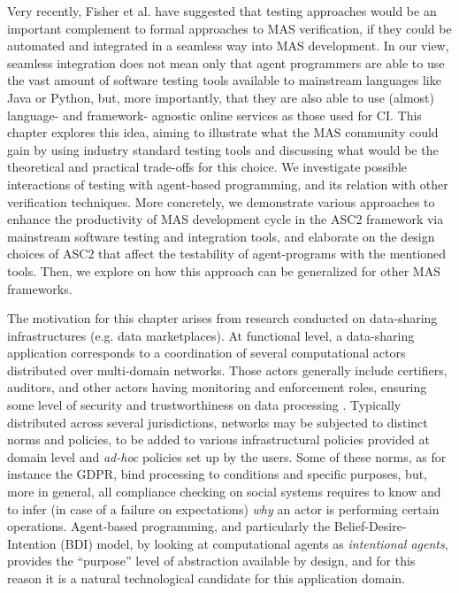 Very recently, Fisher et al. \cite{Fisher2020} have suggested that testing approaches would be an important complement to formal approaches to MAS verification, if they could be automated and integrated in a seamless way into MAS development. In our view, seamless integration  does not mean only that agent programmers are able to use the vast amount of software testing tools available to mainstream languages like Java or Python, but, more importantly, that they are also able to use (almost) language- and framework- agnostic online services as those used for CI. This chapter explores this idea, aiming to illustrate what the MAS community could gain by using industry standard testing tools and discussing what would be the theoretical and practical trade-offs for this choice. We investigate possible interactions of testing with agent-based programming, and its relation with other verification techniques. More concretely, we demonstrate various approaches to enhance the productivity of MAS development cycle in the ASC2 framework via mainstream software testing and integration tools, and elaborate on the design choices of ASC2 that affect the testability of agent-programs with the mentioned tools. Then, we explore on how this approach can be generalized for other MAS frameworks.

The motivation for this chapter arises from research conducted
on data-sharing infrastructures (e.g. data marketplaces). At functional level, a data-sharing application corresponds to a coordination of several computational actors distributed over multi-domain networks. Those actors generally include certifiers, auditors, and other actors having monitoring and enforcement roles, ensuring some level of security and trustworthiness on data processing \cite{Zhou2020}.  Typically distributed across several jurisdictions, networks may be subjected to distinct norms and policies, to be added to  various infrastructural policies provided at domain level and \textit{ad-hoc} policies set up by the users. Some of these norms, as for instance the GDPR, bind  processing to conditions and specific purposes, but, more in general, all compliance checking on social systems requires to know and to infer (in case of a failure on expectations) \textit{why} an actor is performing certain operations. 
Agent-based programming, and particularly the Belief-Desire-Intention (BDI) model, by looking at computational agents as \textit{intentional agents}, provides the ``purpose'' level of abstraction available by design, and for this reason it is a natural technological candidate for this application domain. 

